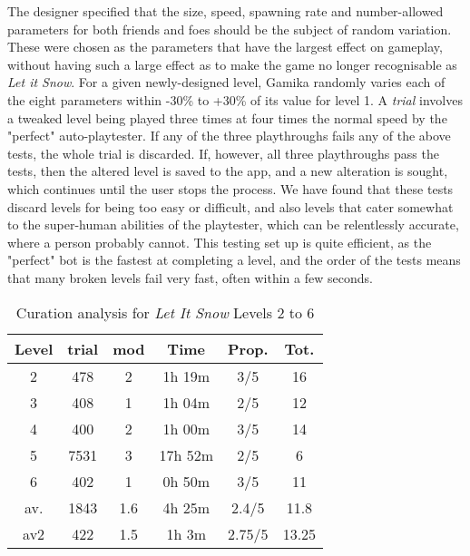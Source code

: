 \documentclass{IEEEtran}
\begin{document}
The designer specified that the size, speed, spawning rate and number-allowed parameters for both friends and foes should be the subject of random variation. These were chosen as the parameters that have the largest effect on gameplay, without having such a large effect as to make the game no longer recognisable as \emph{Let it Snow}. For a given newly-designed level, Gamika randomly varies each of the eight parameters within -30\% to +30\% of its value for level 1. A \emph{trial} involves a tweaked level being played three times at four times the normal speed by the "perfect" auto-playtester. If any of the three playthroughs fails any of the above tests, the whole trial is discarded. If, however, all three playthroughs pass the tests, then the altered level is saved to the app, and a new alteration is sought, which continues until the user stops the process. We have found that these tests discard levels for being too easy or difficult, and also levels that cater somewhat to the super-human abilities of the playtester, which can be relentlessly accurate, where a person probably cannot. This testing set up is quite efficient, as the "perfect" bot is the fastest at completing a level, and the order of the tests means that many broken levels fail very fast, often within a few seconds.


\begin{table}
\caption{Curation analysis for \textit{Let It Snow} Levels 2 to 6}
\begin{center}
    \begin{tabular}[c]{|c||c|c|c|c||c|}
    \hline
        Level & trial & mod & Time & Prop. & Tot.  \\
        \hline
         2 & 478 &2 &1h 19m &3/5 & 16 \\
         3 & 408 & 1 &1h 04m & 2/5 &12 \\
         4 & 400 &2 &1h 00m &3/5 & 14\\
         5 & 7531 & 3 & 17h 52m &2/5 & 6\\
         6 & 402 & 1 &0h 50m &3/5 &11 \\
         \hline
         av.& 1843 & 1.6 & 4h 25m & 2.4/5 & 11.8\\
         av2 & 422 & 1.5 &1h 3m &2.75/5 & 13.25\\
         \hline
    \end{tabular}
\end{center}
\end{table}
\label{Table 1}
\end{document}
